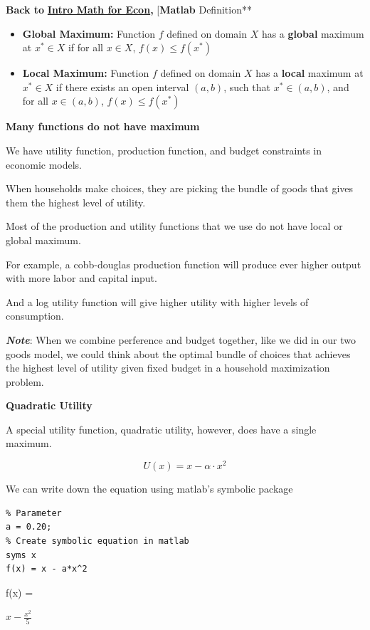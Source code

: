 \documentclass[
]{book}
\begin{document}
\textbf{Back to} \href{https://math4econ.github.io/}{\textbf{Intro Math for Econ}}\textbf{,}
{[}\textbf{Matlab
}Definition**

\begin{itemize}
\item
  \textbf{Global Maximum:} Function \(f\) defined on domain \(X\) has a
  \textbf{global} maximum at \(x^* \in X\) if for all \(x\in X\),
  \(f(x)\le f(x^* )\)
\item
  \textbf{Local Maximum:} Function \(f\) defined on domain \(X\) has a
  \textbf{local} maximum at \(x^* \in X\) if there exists an open interval
  \(\left(a,b\right)\), such that \(x^* \in \left(a,b\right)\), and for
  all \(x\in \left(a,b\right)\), \(f(x)\le f(x^* )\)
\end{itemize}

\textbf{Many functions do not have maximum}

We have utility function, production function, and budget constraints in
economic models.

When households make choices, they are picking the bundle of goods that
gives them the highest level of utility.

Most of the production and utility functions that we use do not have
local or global maximum.

For example, a cobb-douglas production function will produce ever higher
output with more labor and capital input.

And a log utility function will give higher utility with higher levels
of consumption.

\textbf{\emph{Note}}: When we combine perference and budget together, like we did
in our two goods model, we could think about the optimal bundle of
choices that achieves the highest level of utility given fixed budget in
a household maximization problem.

\textbf{Quadratic Utility}

A special utility function, quadratic utility, however, does have a
single maximum.

\[U(x)=x-\alpha \cdot x^2\]

We can write down the equation using matlab's symbolic package

\begin{verbatim}
% Parameter
a = 0.20;
% Create symbolic equation in matlab
syms x
f(x) = x - a*x^2
\end{verbatim}

f(x) =

\(\displaystyle x-\frac{x^2 }{5}\)
\end{document}
